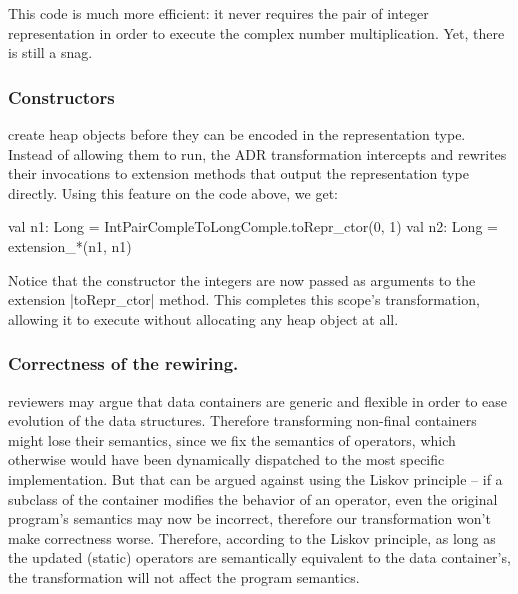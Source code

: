 This code is much more efficient: it never requires the pair of integer representation in order to execute the complex number multiplication. Yet, there is still a snag.

\subsubsection{Constructors} create heap objects before they can be encoded in the representation type. Instead of allowing them to run, the ADR transformation intercepts and rewrites their invocations to extension methods that output the representation type directly. Using this feature on the code above, we get:

\begin{lstlisting-nobreak}
val n1: Long = IntPairCompleToLongComple.toRepr_ctor(0, 1)
val n2: Long = extension_*(n1, n1)
\end{lstlisting-nobreak}

Notice that the constructor the integers are now passed as arguments to the extension |toRepr_ctor| method. This completes this scope's transformation, allowing it to execute without allocating any heap object at all.

\subsubsection{Correctness of the rewiring.}
reviewers may argue that data containers are generic and flexible in order to ease evolution of the data structures. Therefore transforming non-final containers might lose their semantics, since we fix the semantics of operators, which otherwise would have been dynamically dispatched to the most specific implementation. But that can be argued against using the Liskov principle -- if a subclass of the container modifies the behavior of an operator, even the original program's semantics may now be incorrect, therefore our transformation won't make correctness worse. Therefore, according to the Liskov principle, as long as the updated (static) operators are semantically equivalent to the data container's, the transformation will not affect the program semantics.

